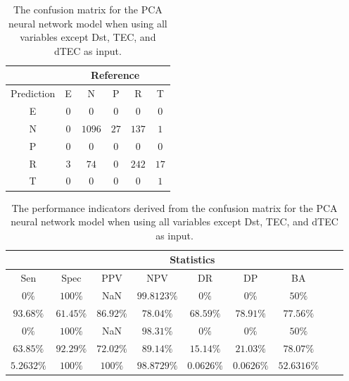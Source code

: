 \begin{table}[!ht]
	\centering
	\begin{tabular}{|c|c|c|c|c|c|}
		\hline
		 & \multicolumn{5}{|c|}{Reference} \\ \hline
		 Prediction & E & N & P & R & T \\ \hline
		 E & $0$ & $0$ & $0$ & $0$ & $0$ \\ \hline
		 N & $0$ & $1096$ & $27$ & $137$ & $1$ \\ \hline
		 P & $0$ & $0$ & $0$ & $0$ & $0$ \\ \hline
		 R & $3$ & $74$ & $0$ & $242$ & $17$ \\ \hline
		 T & $0$ & $0$ & $0$ & $0$ & $1$ \\ \hline
	\end{tabular}
	\caption{The confusion matrix for the PCA neural network model when using all variables except Dst, TEC, and dTEC as input.}
	\label{tab:cm:noTEC:pcaNNet}
\end{table}

\begin{table}[!ht]
	\centering
	\begin{tabular}{|c|c|c|c|c|c|c|c|c|}
		\hline
		 & \multicolumn{7}{c|}{Statistics} \\ \hline
		Sen & Spec & PPV & NPV & DR & DP & BA \\ \hline
		$0\%$ & $100\%$ & NaN & $99.8123\%$ & $0\%$ & $0\%$ & $50\%$ \\ \hline
		$93.68\%$ & $61.45\%$ & $86.92\%$ & $78.04\%$ & $68.59\%$ & $78.91\%$ & $77.56\%$ \\ \hline
		$0\%$ & $100\%$ & NaN & $98.31\%$ & $0\%$ & $0\%$ & $50\%$ \\ \hline
		$63.85\%$ & $92.29\%$ & $72.02\%$ & $89.14\%$ & $15.14\%$ & $21.03\%$ & $78.07\%$ \\ \hline
		$5.2632\%$ & $100\%$ & $100\%$ & $98.8729\%$ & $0.0626\%$ & $0.0626\%$ & $52.6316\%$ \\ \hline
	\end{tabular}
	\caption{The performance indicators derived from the confusion matrix for the PCA neural network model when using all variables except Dst, TEC, and dTEC as input.}
	\label{tab:cs:noTEC:pcaNNet}
\end{table}

